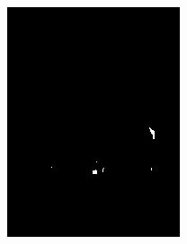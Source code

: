 \begin{figure}[h]
{\begin{subfigure}[b]{0.23\textwidth}
         \includegraphics[width=\textwidth]{images/results/cross/att-massu.jpg_ecu_sch_skinny_157.png}
     \end{subfigure}
    \hfill
     \begin{subfigure}[b]{0.23\textwidth}
         \centering

\end{subfigure}}
\end{figure}
